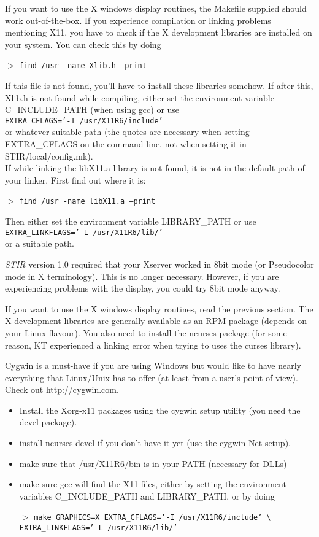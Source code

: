 \documentclass{article}
\newcommand{\cmdline}[1]{\par \noindent $>$ \texttt{#1}\par}
\begin{document}
If you want to use the X windows display routines, the Makefile 
supplied should work out-of-the-box. If you experience compilation 
or linking problems mentioning X11, you have to check if the 
X development libraries are installed on your system. You can 
check this by doing
\cmdline{find /usr -name Xlib.h -print}


If this file is not found, you'll have to install these libraries 
somehow. If after this, Xlib.h is not found while compiling, 
either set the environment variable C\_INCLUDE\_PATH (when using 
gcc) or use \\
\texttt{EXTRA\_CFLAGS='-I /usr/X11R6/include' }\\
or whatever suitable path (the quotes are necessary when setting 
EXTRA\_CFLAGS on the command line, not when setting it in 
STIR/local/config.mk).\\
If while linking the libX11.a library is not found, it is not 
in the default path of your linker. First find out where it is:
\cmdline{find /usr -name libX11.a --print}


Then either set the environment variable LIBRARY\_PATH or use \\
\texttt{EXTRA\_LINKFLAGS='-L /usr/X11R6/lib/'}\\
 or a suitable path.


\textit{STIR} version 1.0 required that your Xserver worked in 8bit 
mode (or Pseudocolor mode in X terminology). This is no longer 
necessary. However, if you are experiencing problems with the 
display, you could try 8bit mode anyway.

{ 
}

If you want to use the X windows display routines, read the previous 
section. The X development libraries are generally available 
as an RPM package (depends on your Linux flavour). You also need 
to install the ncurses package (for some reason, KT experienced 
a linking error when trying to uses the curses library).

{ 
}

Cygwin is a must-have if you are using Windows but would like 
to have nearly everything that Linux/Unix has to offer (at least 
from a user's point of view). Check out http://cygwin.com.

{ 
}
\begin{itemize}
\item Install the Xorg-x11 packages using the cygwin setup utility 
(you need the devel package).
\item 
install ncurses-devel if you don't have it yet (use the cygwin 
Net setup).
\item make sure that /usr/X11R6/bin is in your PATH (necessary 
for DLLs)
\item
make sure gcc will find the X11 files, either by setting the 
environment variables C\_INCLUDE\_PATH and LIBRARY\_PATH, or by 
doing
\cmdline{make GRAPHICS=X EXTRA\_CFLAGS='-I /usr/X11R6/include' 
{\textbackslash} \\
EXTRA\_LINKFLAGS='-L 
/usr/X11R6/lib/'}
\end{itemize}
\end{document}
